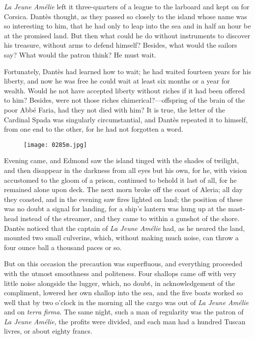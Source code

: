 \textit{La Jeune Amélie} left it three-quarters of a league to the larboard
and kept on for Corsica. Dantès thought, as they passed so closely to
the island whose name was so interesting to him, that he had only to
leap into the sea and in half an hour be at the promised land. But then
what could he do without instruments to discover his treasure, without
arms to defend himself? Besides, what would the sailors say? What would
the patron think? He must wait.

Fortunately, Dantès had learned how to wait; he had waited fourteen
years for his liberty, and now he was free he could wait at least six
months or a year for wealth. Would he not have accepted liberty without
riches if it had been offered to him? Besides, were not those riches
chimerical?—offspring of the brain of the poor Abbé Faria, had they not
died with him? It is true, the letter of the Cardinal Spada was
singularly circumstantial, and Dantès repeated it to himself, from one
end to the other, for he had not forgotten a word.

\begin{figure}[ht]
\texttt{[image: 0285m.jpg]}
\end{figure}

Evening came, and Edmond saw the island tinged with the shades of
twilight, and then disappear in the darkness from all eyes but his own,
for he, with vision accustomed to the gloom of a prison, continued to
behold it last of all, for he remained alone upon deck. The next morn
broke off the coast of Aleria; all day they coasted, and in the evening
saw fires lighted on land; the position of these was no doubt a signal
for landing, for a ship’s lantern was hung up at the mast-head instead
of the streamer, and they came to within a gunshot of the shore. Dantès
noticed that the captain of \textit{La Jeune Amélie} had, as he neared the
land, mounted two small culverins, which, without making much noise,
can throw a four ounce ball a thousand paces or so.

But on this occasion the precaution was superfluous, and everything
proceeded with the utmost smoothness and politeness. Four shallops came
off with very little noise alongside the lugger, which, no doubt, in
acknowledgement of the compliment, lowered her own shallop into the
sea, and the five boats worked so well that by two o’clock in the
morning all the cargo was out of \textit{La Jeune Amélie} and on \textit{terra
firma}. The same night, such a man of regularity was the patron of \textit{La
Jeune Amélie}, the profits were divided, and each man had a hundred
Tuscan livres, or about eighty francs.

